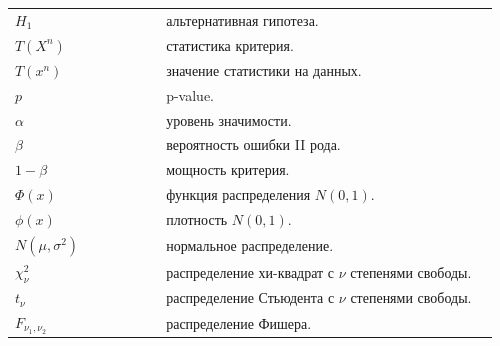 {\begin{longtable}{@{}>{\raggedright\arraybackslash}p{0.30\linewidth}>{\raggedright\arraybackslash}p{0.66\linewidth}@{}}
$H_1$ & альтернативная гипотеза. \\
$T(X^n)$ & статистика критерия. \\
$T(x^n)$ & значение статистики на данных. \\
$p$ & p-value. \\
$\alpha$ & уровень значимости. \\
$\beta$ & вероятность ошибки II рода. \\
$1-\beta$ & мощность критерия. \\
$\Phi(x)$ & функция распределения $N(0,1)$. \\
$\phi(x)$ & плотность $N(0,1)$. \\
$N(\mu,\sigma^2)$ & нормальное распределение. \\
$\chi^2_\nu$ & распределение хи-квадрат с $\nu$ степенями свободы. \\
$t_\nu$ & распределение Стьюдента с $\nu$ степенями свободы. \\
$F_{\nu_1,\nu_2}$ & распределение Фишера. \\
\end{longtable}
}
